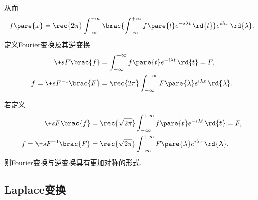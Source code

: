 \documentclass[../ComplexVariable.tex]{subfiles}
\begin{document}
从而
\[ f\pare{x} = \rec{2\pi} \int_{-\infty}^{+\infty} \brac{\int_{-\infty}^{+\infty} f\pare{t} e^{-i\lambda t}\,\rd{t}}e^{i\lambda x}\,\rd{\lambda}. \]
定义Fourier变换及其逆变换
\begin{align*}
    \+sF\brac{f} &= \int_{-\infty}^{+\infty} f\pare{t} e^{-i\lambda t}\,\rd{t} = F,\\
    f = \+sF^{-1}\brac{F} &= \rec{2\pi} \int_{-\infty}^{+\infty} F\pare{\lambda} e^{i\lambda x}\,\rd{\lambda}.
\end{align*}
\begin{remark}
    若定义
    \begin{align*}
        \+sF\brac{f} &= \rec{\sqrt{2\pi}}\int_{-\infty}^{+\infty} f\pare{t} e^{-i\lambda t}\,\rd{t} = F,\\
    f = \+sF^{-1}\brac{F} &= \rec{\sqrt{2\pi}} \int_{-\infty}^{+\infty} F\pare{\lambda} e^{i\lambda x}\,\rd{\lambda},
    \end{align*}
    则Fourier变换与逆变换具有更加对称的形式.
\end{remark}


\subsection{Laplace变换} %
\label{sub:laplace变换}
\end{document}
